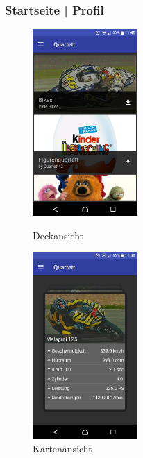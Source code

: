 \documentclass{scrartcl}
\begin{document}
\subsubsection{Startseite | Profil}


\begin{figure}[!ht]
  \centering
  \begin{minipage}{0.45\textwidth}
    \centering
    \includegraphics[width=4cm]{img/gallery_decks.png}
    \caption{Deckansicht}
  \end{minipage}
  \hfill
  \begin{minipage}{0.45\textwidth}
    \centering
    \includegraphics[width=4cm]{img/gallery_cards.png}
    \caption{Kartenansicht}
  \end{minipage}
\end{figure}
\end{document}
